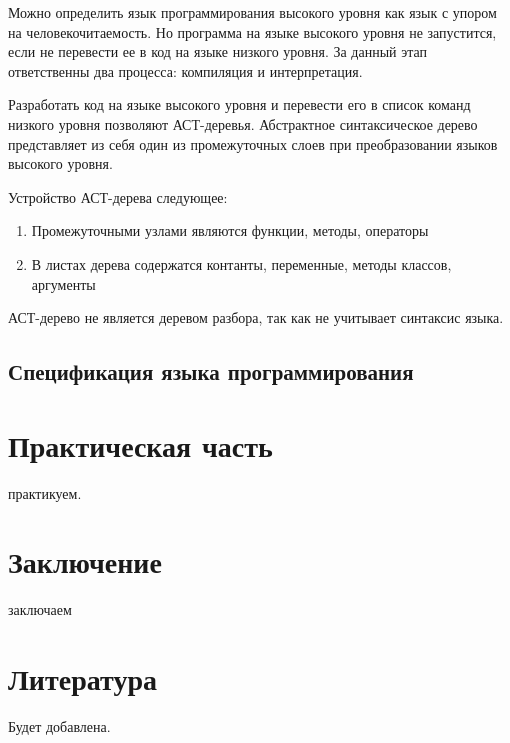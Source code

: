 \documentclass{mipt-thesis-bs}
\begin{document}
Можно определить язык программирования высокого уровня как язык с упором на человекочитаемость. Но
программа на языке высокого уровня не запустится, если не перевести ее в код на языке низкого уровня. За
данный этап ответственны два процесса: компиляция и интерпретация.

Разработать код на языке высокого уровня и перевести его в список команд низкого уровня позволяют АСТ-деревья.
Абстрактное синтаксическое дерево представляет из себя один из промежуточных слоев при преобразовании языков
высокого уровня.

Устройство АСТ-дерева следующее:

\begin{enumerate}
    \item Промежуточными узлами являются функции, методы, операторы
    \item В листах дерева содержатся контанты, переменные, методы классов, аргументы
\end{enumerate}

АСТ-дерево не является деревом разбора, так как не учитывает синтаксис языка.

\section{Спецификация языка программирования}



\chapter{Практическая часть}
практикуем.

\chapter{Заключение}
заключаем

\backmatter


\chapter{Литература}

Будет добавлена.
\end{document}
